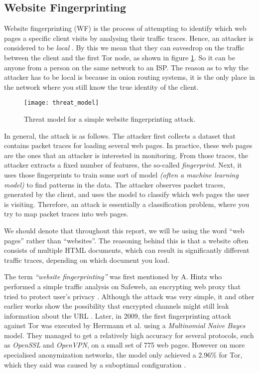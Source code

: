 \subsection{Website Fingerprinting} \label{sec:related-work}

Website fingerprinting (WF) is the process of attempting to identify which web pages a specific client visits by analysing their traffic traces.
Hence, an attacker is considered to be \textit{local} . By this we mean that they can eavesdrop on the traffic between the client and the first Tor node, as shown in figure \ref{fig:threat_model}.
So it can be anyone from a person on the same network to an ISP.
The reason as to why the attacker has to be local is because in onion routing systems, it is the only place in the network where you still know
the true identity of the client.

\begin{figure}[ht]
  \centering
  \texttt{[image: threat\_model]}
  \caption{Threat model for a simple website fingerprinting attack.}
  \label{fig:threat_model}
\end{figure}

In general, the attack is as follows. The attacker first collects a dataset that contains packet traces for loading several web pages.
In practice, these web pages are the ones that an attacker is interested in monitoring.
From those traces, the attacker extracts a fixed number of features, the so-called \textit{fingerprint}.
Next, it uses those fingerprints to train some sort of model \textit{(often a machine learning model)} to find patterns in the data.
The attacker observes packet traces, generated by the client, and uses the model to classify which web pages the user is visiting.
Therefore, an attack is essentially a classification problem, where you try to map packet traces into web pages.

We should denote that throughout this report, we will be using the word ``web pages'' rather than ``websites''.
The reasoning behind this is that a website often consists of multiple HTML documents,
which can result in significantly different traffic traces, depending on which document you load.

The term \textit{``website fingerprinting''} was first mentioned by A. Hintz who performed a simple traffic analysis on Safeweb,
an encrypting web proxy that tried to protect user's privacy \cite{hintz2002fingerprinting}. Although the attack was very simple, it and other earlier
works show the possibility that encrypted channels might still leak information about the URL \cite{hintz2002fingerprinting, wagner1996analysis}.
Later, in 2009, the first fingerprinting attack against Tor was executed by Herrmann et al. using a \textit{Multinomial Naive Bayes} model.
They managed to get a relatively high accuracy for several protocols, such as \textit{OpenSSL} and \textit{OpenVPN}, on a small set of 775 web pages.
However on more specialised anonymization networks, the model only achieved a 2.96\% for Tor, which they said was caused by a suboptimal configuration \cite{herrmann2009website}.


